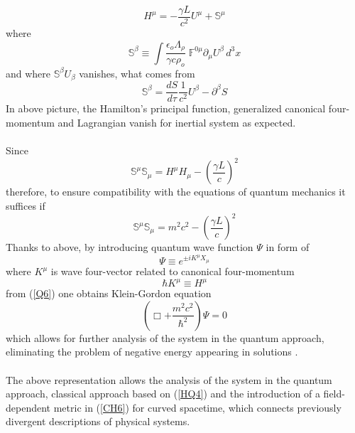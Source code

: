 \documentclass[aps,prx,preprint,groupedaddress,showkeys]{revtex4-2}
\newcommand{\mds}[1] {\frac{d {#1}}{d\tau}}
\begin{document}
\begin{equation} \label{Q5}
H^{\mu} = - \frac{\gamma L}{c^2}U^{\mu} + \mathbb{S}^{\mu}
\end{equation}
where
\begin{equation} \label{Q5}
\mathbb{S}^{\beta} \equiv \int \frac{\epsilon_o \Lambda_{\rho}}{\gamma c \rho_o} \; \mathbb{F}^{0 \mu} \partial_{\mu} U^{\beta}  \, d^3 x
\end{equation}
and where $\mathbb{S}^{\beta}U_{\beta}$ vanishes, what comes from 
\begin{equation} \label{Q5a}
\mathbb{S}^{\beta} = \mds{S}  \frac{1}{c^2} U^{\beta} - \partial^{\beta} S 
\end{equation}
In above picture, the Hamilton's principal function, generalized canonical four-momentum and Lagrangian vanish for inertial system as expected. \\
~\\
Since
\begin{equation} \label{Q6}
\mathbb{S}^{\mu}\mathbb{S}_{\mu} = H^{\mu}H_{\mu} - \left ( \frac{\gamma L}{c} \right )^2
\end{equation}
therefore, to ensure compatibility with the equations of quantum mechanics it suffices if
\begin{equation} \label{Q7}
\mathbb{S}^{\mu}\mathbb{S}_{\mu} = m^2c^2 - \left ( \frac{\gamma L}{c} \right )^2
\end{equation}
Thanks to above, by introducing quantum wave function $\Psi$ in form of 
\begin{equation} \label{Q8}
\Psi \equiv e^{\pm iK^{\mu} X_{\mu}}
\end{equation} 
where $K^{\mu}$ is wave four-vector related to canonical four-momentum 
\begin{equation} \label{Q9}
\hbar  K^{\mu} \equiv H^{\mu}
\end{equation}
from (\ref{Q6}) one obtains Klein-Gordon equation
\begin{equation} \label{Q10}
\left ( \Box + \frac{m^2c^2}{\hbar^2} \right ) \Psi = 0
\end{equation} 
which allows for further analysis of the system in the quantum approach, eliminating the problem of negative energy appearing in solutions \cite{KGE}. \\
~\\
The above representation allows the analysis of the system in the quantum approach, classical approach based on (\ref{HQ4}) and the introduction of a field-dependent metric in (\ref{CH6}) for curved spacetime, which connects previously divergent descriptions of physical systems.
\end{document}

